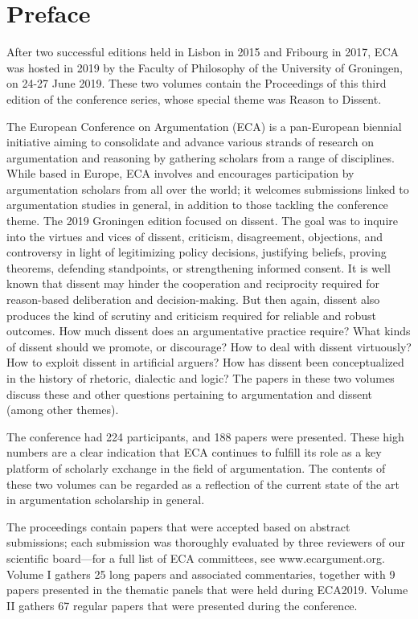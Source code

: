 \section*{Preface}

After two successful editions held in Lisbon in 2015 and Fribourg in 2017, ECA was hosted in 2019 by the Faculty of Philosophy of the University of Groningen, on 24-27 June 2019. These two volumes contain the Proceedings of this third edition of the conference series, whose special theme was Reason to Dissent.

The European Conference on Argumentation (ECA) is a pan-European biennial initiative aiming to consolidate and advance various strands of research on argumentation and reasoning by gathering scholars from a range of disciplines. While based in Europe, ECA involves and encourages participation by argumentation scholars from all over the world; it welcomes submissions linked to argumentation studies in general, in addition to those tackling the conference theme. The 2019 Groningen edition focused on dissent. The goal was to inquire into the virtues and vices of dissent, criticism, disagreement, objections, and controversy in light of legitimizing policy decisions, justifying beliefs, proving theorems, defending standpoints, or strengthening informed consent. It is well known that dissent may hinder the cooperation and reciprocity required for reason-based deliberation and decision-making. But then again, dissent also produces the kind of scrutiny and criticism required for reliable and robust outcomes. How much dissent does an argumentative practice require? What kinds of dissent should we promote, or discourage? How to deal with dissent virtuously? How to exploit dissent in artificial arguers? How has dissent been conceptualized in the history of rhetoric, dialectic and logic? The papers in these two volumes discuss these and other questions pertaining to argumentation and dissent (among other themes).

The conference had 224 participants, and 188 papers were presented. These high numbers are a clear indication that ECA continues to fulfill its role as a key platform of scholarly exchange in the field of argumentation. The contents of these two volumes can be regarded as a reflection of the current state of the art in argumentation scholarship in general.

The proceedings contain papers that were accepted based on abstract submissions; each submission was thoroughly evaluated by three reviewers of our scientific board—for a full list of ECA committees, see www.ecargument.org. Volume I gathers 25 long papers and associated commentaries, together with 9 papers presented in the thematic panels that were held during ECA2019. Volume II gathers 67 regular papers that were presented during the conference. 

